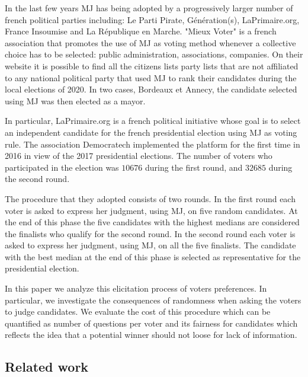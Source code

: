 In the last few years \ac{MJ} has being adopted by a progressively larger number of french political parties including: Le Parti Pirate, Génération(s), LaPrimaire.org, France Insoumise and La République en Marche.
"Mieux Voter" \citep{MV} is a french association that promotes the use of \ac{MJ} as voting method whenever a collective choice has to be selected: public administration, associations, companies. On their website it is possible to find all the citizens lists \textendash party lists that are not affiliated to any national political party \textemdash that used \ac{MJ} to rank their candidates during the local elections of 2020. In two cases, Bordeaux et Annecy, the candidate selected using \ac{MJ} was then elected as a mayor. 

In particular, LaPrimaire.org \citep{LaPrimaire} is a french political initiative whose goal is to select an independent candidate for the french presidential election using \ac{MJ} as voting rule. The association Democratech implemented the platform for the first time in 2016 in view of the 2017 presidential elections. The number of voters who participated in the election was $10676$ during the first round, and $32685$ during the second round.

The procedure that they adopted consists of two rounds. In the first round each voter is asked to express her judgment, using \ac{MJ}, on five random candidates. At the end of this phase the five candidates with the highest medians are considered the finalists who qualify for the second round. In the second round each voter is asked to express her judgment, using \ac{MJ}, on all the five finalists. The candidate with the best median at the end of this phase is selected as representative for the presidential election.

In this paper we analyze this elicitation process of voters preferences. In particular, we investigate the consequences of randomness when asking the voters to judge candidates. We evaluate the cost of this procedure \textemdash which can be quantified as number of questions per voter \textemdash and its fairness for candidates \textemdash which reflects the idea that a potential winner should not loose for lack of information.


\subsection{Related work}

